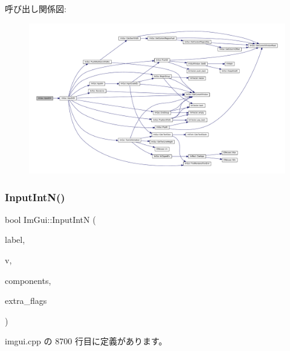 呼び出し関係図\+:\nopagebreak
\begin{figure}[H]
\begin{center}
\leavevmode
\includegraphics[width=350pt]{namespace_im_gui_ac714ecf202c82dc6caa0cbf344c85a13_cgraph}
\end{center}
\end{figure}
\mbox{\label{namespace_im_gui_a9b9aaec8d095156b74ee191b532fa137}} 
\subsubsection{\texorpdfstring{Input\+Int\+N()}{InputIntN()}}
{\footnotesize\ttfamily bool Im\+Gui\+::\+Input\+IntN (\begin{DoxyParamCaption}\item[{const char $\ast$}]{label,  }\item[{int $\ast$}]{v,  }\item[{int}]{components,  }\item[{\mbox{\hyperlink{imgui_8h_a7d2c6153a6b9b5d3178ce82434ac9fb8}{Im\+Gui\+Input\+Text\+Flags}}}]{extra\+\_\+flags }\end{DoxyParamCaption})}



 imgui.\+cpp の 8700 行目に定義があります。


